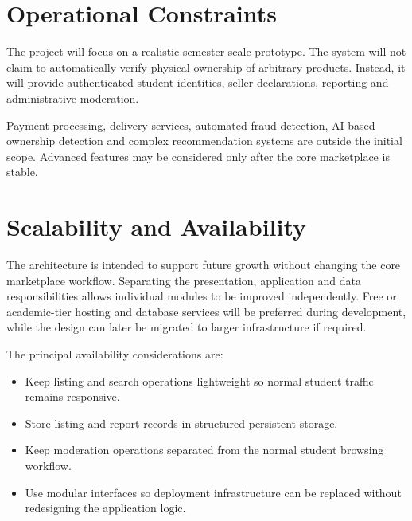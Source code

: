 \documentclass[11pt,a4paper]{article}
\begin{document}

\section{Operational Constraints}

The project will focus on a realistic semester-scale prototype. The
system will not claim to automatically verify physical ownership of
arbitrary products. Instead, it will provide authenticated student
identities, seller declarations, reporting and administrative
moderation.

Payment processing, delivery services, automated fraud detection,
AI-based ownership detection and complex recommendation systems are
outside the initial scope. Advanced features may be considered only
after the core marketplace is stable.


\section{Scalability and Availability}

The architecture is intended to support future growth without
changing the core marketplace workflow. Separating the presentation,
application and data responsibilities allows individual modules to be
improved independently. Free or academic-tier hosting and database
services will be preferred during development, while the design can
later be migrated to larger infrastructure if required.

The principal availability considerations are:

\begin{itemize}

    \item Keep listing and search operations lightweight so normal
    student traffic remains responsive.

    \item Store listing and report records in structured persistent
    storage.

    \item Keep moderation operations separated from the normal
    student browsing workflow.

    \item Use modular interfaces so deployment infrastructure can be
    replaced without redesigning the application logic.

\end{itemize}
\end{document}
